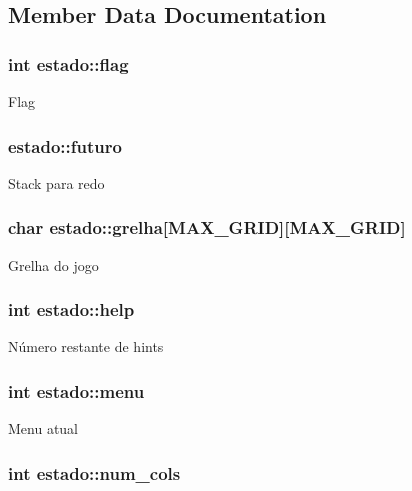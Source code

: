 \subsection{Member Data Documentation}
\hypertarget{structestado_a6786d825e542118c5d79b852ace947f7}{
\subsubsection[{flag}]{\setlength{\rightskip}{0pt plus 5cm}int estado\+::flag}}\label{structestado_a6786d825e542118c5d79b852ace947f7}
Flag \hypertarget{structestado_af5d593ebecd3046a3df69b1ddec6942f}{
\subsubsection[{futuro}]{ estado\+::futuro}}\label{structestado_af5d593ebecd3046a3df69b1ddec6942f}
Stack para redo \hypertarget{structestado_a7d72f243f07d0d277f24e15e28a9a7b2}{
\subsubsection[{grelha}]{\setlength{\rightskip}{0pt plus 5cm}char estado\+::grelha\mbox{[}{\bf M\+A\+X\+\_\+\+G\+R\+I\+D}\mbox{]}\mbox{[}{\bf M\+A\+X\+\_\+\+G\+R\+I\+D}\mbox{]}}}\label{structestado_a7d72f243f07d0d277f24e15e28a9a7b2}
Grelha do jogo \hypertarget{structestado_a488c0d087dcc7e84034cdd814cf3bf3b}{
\subsubsection[{help}]{\setlength{\rightskip}{0pt plus 5cm}int estado\+::help}}\label{structestado_a488c0d087dcc7e84034cdd814cf3bf3b}
Número restante de hints \hypertarget{structestado_a219ca4fd4c068f749afedb392e3f83b0}{
\subsubsection[{menu}]{\setlength{\rightskip}{0pt plus 5cm}int estado\+::menu}}\label{structestado_a219ca4fd4c068f749afedb392e3f83b0}
Menu atual \hypertarget{structestado_a5b68d5d6aae41b5b7dd9308e40d53506}{
\subsubsection[{num\+\_\+cols}]{\setlength{\rightskip}{0pt plus 5cm}int estado\+::num\+\_\+cols}}\label{structestado_a5b68d5d6aae41b5b7dd9308e40d53506}

